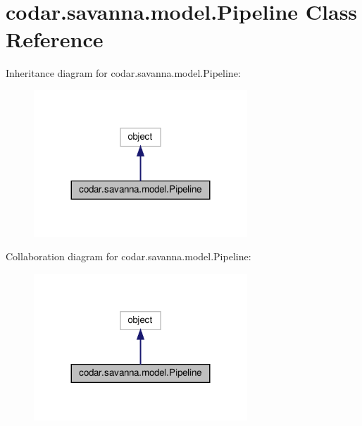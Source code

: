 \hypertarget{classcodar_1_1savanna_1_1model_1_1_pipeline}{}\section{codar.\+savanna.\+model.\+Pipeline Class Reference}
\label{classcodar_1_1savanna_1_1model_1_1_pipeline}


Inheritance diagram for codar.\+savanna.\+model.\+Pipeline\+:
\nopagebreak
\begin{figure}[H]
\begin{center}
\leavevmode
\includegraphics[width=227pt]{classcodar_1_1savanna_1_1model_1_1_pipeline__inherit__graph}
\end{center}
\end{figure}


Collaboration diagram for codar.\+savanna.\+model.\+Pipeline\+:
\nopagebreak
\begin{figure}[H]
\begin{center}
\leavevmode
\includegraphics[width=227pt]{classcodar_1_1savanna_1_1model_1_1_pipeline__coll__graph}
\end{center}
\end{figure}
